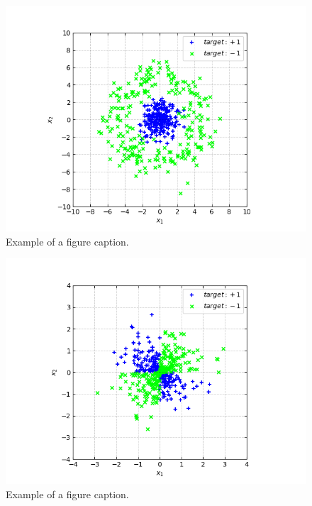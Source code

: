 \documentclass[conference]{IEEEtran}
\begin{document}
\clearpage

\begin{figure}[p!]
\centerline{\includegraphics[trim=65 0 85 0, clip, width=\columnwidth]{Figure_3.png}}
\caption{Example of a figure caption.}
\label{fig:concentgauss}
\end{figure}

\begin{figure}[p!]
\centerline{\includegraphics[trim=70 0 85 0, clip, width=\columnwidth]{Figure_4.png}}
\caption{Example of a figure caption.}
\label{fig:gaussx}
\end{figure}
\end{document}
